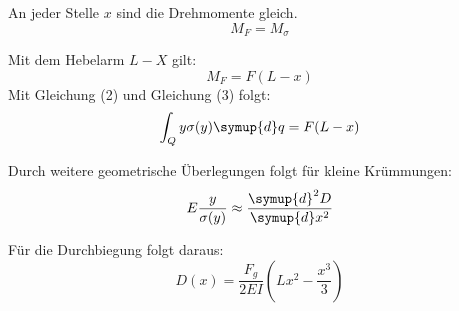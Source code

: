 An jeder Stelle $x$ sind die Drehmomente gleich.
\begin{equation}
  M_F =M_{\sigma}
\end{equation}

Mit dem Hebelarm $L-X$ gilt:
\begin{equation}
  M_F = F(L - x)
\end{equation}
Mit Gleichung (2) und Gleichung (3) folgt:
\begin{equation}
  \int_Q y \sigma(y) \symup{d}q = F(L - x)
\end{equation}

%
%
%
%
%
Durch weitere geometrische Überlegungen folgt für kleine Krümmungen:
\begin{equation}
  E\frac{y}{\sigma(y)} \approx \frac{\symup{d}^2 D}{\symup{d} x^2}
\end{equation}



Für die Durchbiegung folgt daraus:
\begin{equation}
  D(x) = \frac{F_g}{2EI} \left(Lx^2 - \frac{x^3}{3} \right)
\end{equation}

